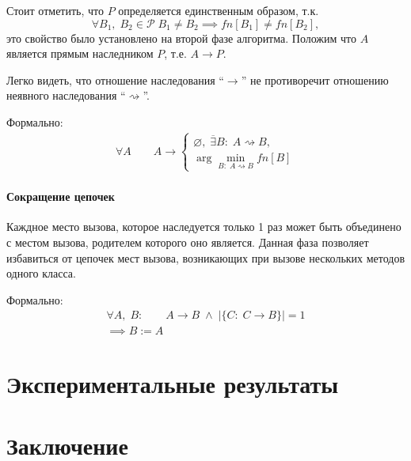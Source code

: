 \documentclass[a4paper,12pt,russian]{article}
\begin{document}
Стоит отметить, что $P$ определяется единственным образом, т.к. \[\forall B_1,\;B_2 \in \mathcal{P}\; B_1 \neq B_2 \implies fn[B_1] \neq fn[B_2],\]
это свойство было установлено на второй фазе алгоритма.
Положим что $A$ является прямым наследником $P$, т.е. $A \rightarrow P$.

Легко видеть, что отношение наследования ``$\rightarrow$'' не противоречит отношению неявного наследования ``$\rightsquigarrow$''.

Формально:
\begin{eqnarray*}
\forall A\qquad A \rightarrow \begin{cases}
\varnothing,\; \overline{\exists} B:\; A \rightsquigarrow B,\\
\arg\min\limits_{B:\; A \rightsquigarrow B}fn[B]
\end{cases}
\end{eqnarray*}

\paragraph{Сокращение цепочек}
Каждное место вызова, которое наследуется только 1 раз может быть объединено с местом вызова, родителем которого оно является.
Данная фаза позволяет избавиться от цепочек мест вызова, возникающих при вызове нескольких методов одного класса.

Формально:
\begin{eqnarray*}
\forall A,\;B:\qquad A \rightarrow B\;\wedge\;|\{C:\; C \rightarrow B\}| = 1\\
\implies B := A
\end{eqnarray*}

\newpage
\section{Экспериментальные результаты}
\section{Заключение}


\clearpage
\end{document}
